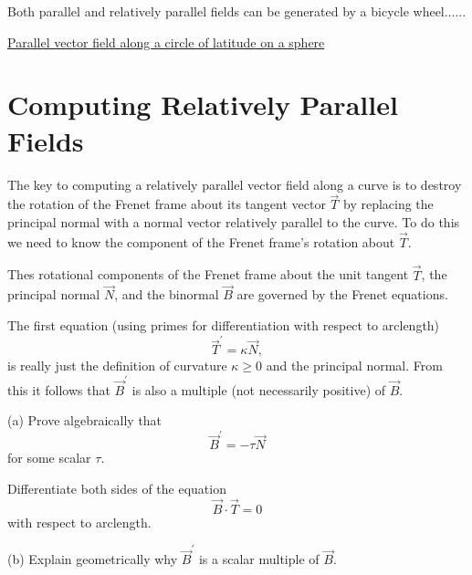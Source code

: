 \documentclass{ximera}
\begin{document}
Both parallel and relatively parallel fields can be generated by a bicycle wheel......

\begin{exploration}
\href{https://www.desmos.com/3d/frbiiccyfd}{Parallel vector field along a circle of latitude on a sphere}
\end{exploration}




\section*{Computing Relatively Parallel Fields}

The key to computing a relatively parallel vector field along a curve is to destroy the rotation of the Frenet frame about its tangent vector $\overrightarrow{T}$ by replacing the principal normal with a normal vector relatively parallel to the curve. To do this we need to know the component of the Frenet frame's rotation about $\overrightarrow{T}$.

Thes rotational components of the Frenet frame about the unit tangent $\overrightarrow{T}$, the principal normal $\overrightarrow{N}$, and the binormal $\overrightarrow{B}$ are governed by the Frenet equations. 

The first equation (using primes for differentiation with respect to arclength)
\begin{equation}
       \overrightarrow{T}^\prime = \kappa \overrightarrow{N} ,   \label{Eq:Curvature}
\end{equation}
is really just the definition of curvature $\kappa \geq 0$ and the principal normal. From this it follows that $\overrightarrow{B}^\prime$ is also a multiple (not necessarily positive) of $\overrightarrow{B}$. 

\begin{exercise}  \label{E:Kldsfttdd}
(a) Prove algebraically that
\begin{equation}
   \overrightarrow{B}^\prime = - \tau \overrightarrow{N}   \label{Eq:Torsion}
\end{equation}
for some scalar $\tau$. 

\begin{hint}
Differentiate both sides of the equation
\[
  \overrightarrow{B} \cdot \overrightarrow{T} = 0
\]
with respect to arclength.
\end{hint}

(b) Explain geometrically why $\overrightarrow{B}^\prime$ is a scalar multiple of $\overrightarrow{B}$. 
\end{exercise}
\end{document}
